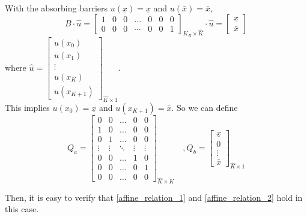 \documentclass[11pt]{article}
\begin{document}
With the absorbing barriers $u(\underline{x}) = \underline{x}$ and $u(\bar{x}) = \bar{x}$,  
\begin{equation}
B\cdot\hat{u} =\begin{bmatrix}
1&0&0&\dots&0&0&0\\
0&0&0&\cdots&0&0&1
\end{bmatrix}_{K_B\times \hat{K}}\cdot\hat{u} = \begin{bmatrix}
\underline{\textit{\~{x}}}\\
\bar{\textit{\~{x}}}
\end{bmatrix}
\end{equation}
where $\hat{u} = \begin{bmatrix}
u(x_0)\\
u(x_1)\\
\vdots\\
u(x_K)\\
u(x_{K+1})
\end{bmatrix}_{\hat{K}\times 1}$.\\
This implies $u(x_0) = \underline{\textit{\~{x}}}$ and $u(x_{K+1}) = \bar{\textit{\~{x}}}$. So we can define 
\begin{equation}
Q_a = \begin{bmatrix}
0& 0&\dots&0&0\\
1&0&\dots&0&0\\
0&1&\dots&0&0\\
\vdots&\vdots&\ddots&\vdots&\vdots\\
0&0&\dots&1&0\\
0&0&\dots&0&1\\
0&0&\dots&0&0
\end{bmatrix}_{\hat{K}\times K}\quad , Q_b = \begin{bmatrix}
\underline{\textit{\~{x}}}\\
0\\
\vdots\\
\bar{\textit{\~{x}}}
\end{bmatrix}_{\hat{K}\times 1}
\end{equation}

Then, it is easy to verify that \eqref{affine_relation_1} and \eqref{affine_relation_2} hold in this case.
\end{document}
